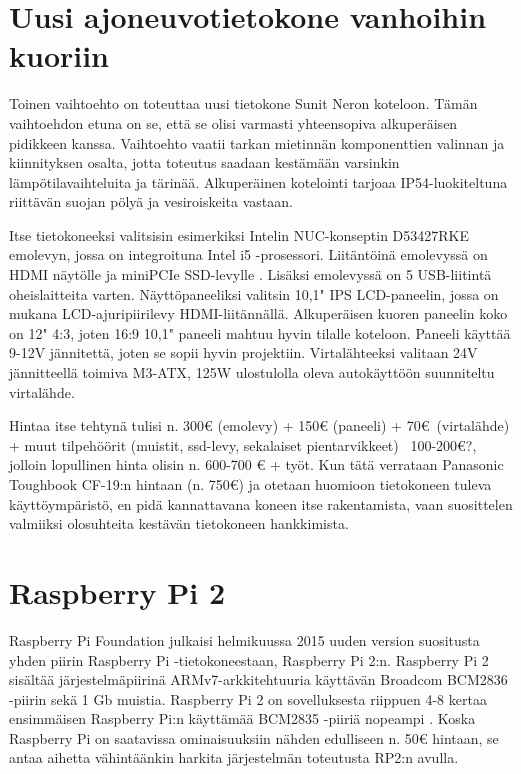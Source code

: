 \documentclass[11pt,a4paper,oneside,article]{memoir}
\begin{document}
\section{Uusi ajoneuvotietokone vanhoihin kuoriin}

Toinen vaihtoehto on toteuttaa uusi tietokone Sunit Neron koteloon. Tämän vaihtoehdon etuna on se, että se olisi varmasti yhteensopiva alkuperäisen pidikkeen kanssa. Vaihtoehto vaatii tarkan mietinnän komponenttien valinnan ja kiinnityksen osalta, jotta toteutus saadaan kestämään varsinkin lämpötilavaihteluita ja tärinää. Alkuperäinen kotelointi tarjoaa IP54-luokiteltuna riittävän suojan pölyä ja vesiroiskeita vastaan.

Itse tietokoneeksi valitsisin esimerkiksi Intelin NUC-konseptin D53427RKE emolevyn, jossa on integroituna Intel i5 -prosessori. Liitäntöinä emolevyssä on HDMI näytölle ja miniPCIe SSD-levylle  \cite{D53427RKE}. Lisäksi emolevyssä on 5 USB-liitintä oheislaitteita varten. Näyttöpaneeliksi valitsin 10,1" IPS LCD-paneelin, jossa on mukana LCD-ajuripiirilevy HDMI-liitännällä. Alkuperäisen kuoren paneelin koko on 12" 4:3, joten 16:9 10,1" paneeli mahtuu hyvin tilalle koteloon. Paneeli käyttää 9-12V jännitettä, joten se sopii hyvin projektiin. Virtalähteeksi valitaan 24V jännitteellä toimiva M3-ATX, 125W ulostulolla oleva autokäyttöön suunniteltu virtalähde.

Hintaa itse tehtynä tulisi n. 300€ (emolevy) + 150€ (paneeli) + 70€ (virtalähde) + muut tilpehöörit (muistit, ssd-levy, sekalaiset pientarvikkeet) ~100-200€?, jolloin lopullinen hinta olisin n. 600-700 € + työt. Kun tätä verrataan Panasonic Toughbook CF-19:n hintaan (n. 750€) ja otetaan huomioon tietokoneen tuleva käyttöympäristö, en pidä kannattavana koneen itse rakentamista, vaan suosittelen valmiiksi olosuhteita kestävän tietokoneen hankkimista.


\section{Raspberry Pi 2}

Raspberry Pi Foundation julkaisi helmikuussa 2015 uuden version suositusta yhden piirin Raspberry Pi -tietokoneestaan, Raspberry Pi 2:n. Raspberry Pi 2 sisältää järjestelmäpiirinä ARMv7-arkkitehtuuria käyttävän Broadcom BCM2836 -piirin sekä 1 Gb muistia. Raspberry Pi 2 on sovelluksesta riippuen 4-8 kertaa ensimmäisen Raspberry Pi:n käyttämää BCM2835 -piiriä nopeampi \cite{raspi2:perf}. Koska Raspberry Pi on saatavissa ominaisuuksiin nähden edulliseen n. 50€ hintaan, se antaa aihetta vähintäänkin harkita järjestelmän toteutusta RP2:n avulla.
\end{document}
